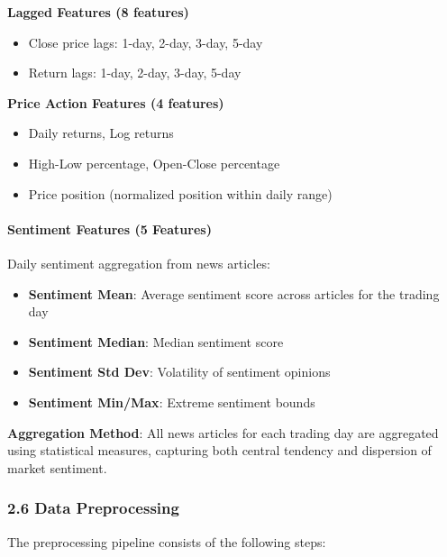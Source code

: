 \documentclass[
]{article}
\begin{document}
\textbf{Lagged Features (8 features)}

\begin{itemize}
\item
  Close price lags: 1-day, 2-day, 3-day, 5-day
\item
  Return lags: 1-day, 2-day, 3-day, 5-day
\end{itemize}

\textbf{Price Action Features (4 features)}

\begin{itemize}
\item
  Daily returns, Log returns
\item
  High-Low percentage, Open-Close percentage
\item
  Price position (normalized position within daily range)
\end{itemize}

\paragraph{Sentiment Features (5
Features)}\label{sentiment-features-5-features}

Daily sentiment aggregation from news articles:

\begin{itemize}
\item
  \textbf{Sentiment Mean}: Average sentiment score across articles for
  the trading day
\item
  \textbf{Sentiment Median}: Median sentiment score
\item
  \textbf{Sentiment Std Dev}: Volatility of sentiment opinions
\item
  \textbf{Sentiment Min/Max}: Extreme sentiment bounds
\end{itemize}

\textbf{Aggregation Method}: All news articles for each trading day are
aggregated using statistical measures, capturing both central tendency
and dispersion of market sentiment.

\subsubsection{2.6 Data Preprocessing}\label{26-data-preprocessing}

The preprocessing pipeline consists of the following steps:
\end{document}
